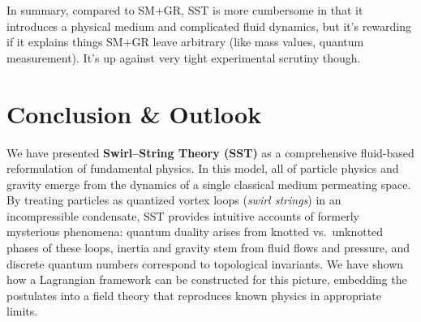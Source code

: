 \documentclass[10pt,reprint,aps,onecolumn,nofootinbib]{revtex4-2}
\begin{document}
In summary, compared to SM+GR, SST is more cumbersome in that it introduces a physical medium and complicated fluid dynamics, but it’s rewarding if it explains things SM+GR leave arbitrary (like mass values, quantum measurement). It's up against very tight experimental scrutiny though.


\section{Conclusion \& Outlook}

We have presented \textbf{Swirl--String Theory (SST)} as a comprehensive fluid-based reformulation of fundamental physics. In this model, all of particle physics and gravity emerge from the dynamics of a single classical medium permeating space. By treating particles as quantized vortex loops (\emph{swirl strings}) in an incompressible condensate, SST provides intuitive accounts of formerly mysterious phenomena: quantum duality arises from knotted vs.\ unknotted phases of these loops, inertia and gravity stem from fluid flows and pressure, and discrete quantum numbers correspond to topological invariants. We have shown how a Lagrangian framework can be constructed for this picture, embedding the postulates into a field theory that reproduces known physics in appropriate limits.
\end{document}
